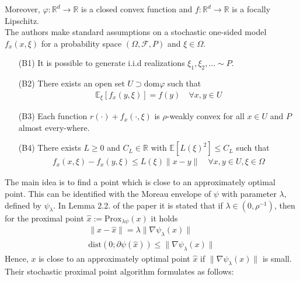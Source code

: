 \documentclass[12pt,a4paper,twoside]{article}
\theoremstyle{plain}
\theoremstyle{note}
\numberwithin{thm}{section}
\newcommand{\prox}[2]{\text{Prox}_{#1}\left(#2\right)}
\let\temp\phi
\let\phi\varphi
\let\varphi\temp
\begin{document}
	Moreover, $\phi: \mathbb{R}^d\to \mathbb{R}$ is a closed convex function and $f: \mathbb{R}^d\to \mathbb{R}$ is a focally Lipschitz. \\
	The authors make standard assumptions on a stochastic one-sided model $f_x(x, \xi)$ for a probability space $(\Omega, \mathcal{F}, P)$ and $\xi \in \Omega$.
	 
	 \begin{itemize}
	 	\item[(B1)] It is possible to generate i.i.d realizations $\xi_1,\xi_2,\dots \sim P$.
	 	\item[(B2)] There exists an open set $U \supset\text{dom}\phi$ such that
	 	\begin{align*}
	 	\mathbb{E}_\xi[f_x(y,\xi)] =  f(y) \quad \forall x,y\in U
	 	\end{align*}
	 	\item[(B3)] Each function $r(\cdot) + f_x(\cdot, \xi)$ is $\rho$-weakly convex for all $x\in U$ and $P$ almost every-where.
	 	\item[(B4)] There exists $L\geq 0$ and $C_L \in \mathbb{R}$ with $\mathbb{E}[L(\xi)^2] \leq C_L $ such that 
	 	\begin{align*}
	 	f_x(x,\xi)-f_x(y,\xi) \leq L(\xi) \|x-y\| \quad \forall x,y\in U, \xi \in \Omega
	 	\end{align*}
	 \end{itemize} 


	The main idea is to find a point which is close to an approximately optimal point. This can be identified with the Moreau envelope of $\psi$ with parameter $\lambda$, defined by $\psi_\lambda$. 
	In Lemma 2.2. of the paper it is stated that if $\lambda \in (0, \rho^{-1})$, then for the proximal point $\hat{x} := \prox{\lambda \psi}{x}$ it holds
	\begin{align*}
		\|x - \hat{x}\| = \lambda \|\nabla \psi_\lambda(x)\| \\
		\text{dist}(0; \partial \psi(\hat{x})) \leq \|\nabla \psi_\lambda(x)\|
	\end{align*} Hence, $x$ is close to an approximately optimal point $\hat{x}$ if $\|\nabla \psi_\lambda(x)\|$ is small.\\
	Their stochastic proximal point algorithm formulates as follows:
	
\end{document}
